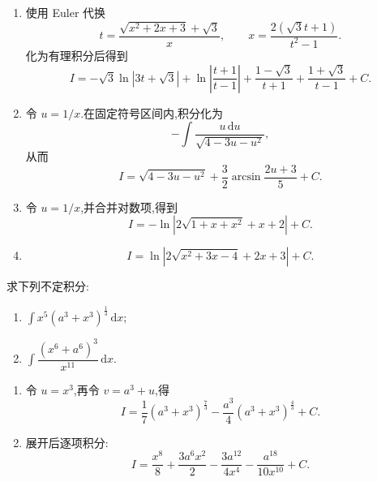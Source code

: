 \begin{solution}
    \begin{enumerate}
        \item 使用 Euler 代换
              \[
                  t=\dfrac{\sqrt{x^2+2x+3}+\sqrt3}{x},
                  \qquad
                  x=\dfrac{2(\sqrt3t+1)}{t^2-1}.
              \]
              化为有理积分后得到
              \[
                  I=-\sqrt3\ln|3t+\sqrt3|+\ln\left|\dfrac{t+1}{t-1}\right|
                  +\dfrac{1-\sqrt3}{t+1}+\dfrac{1+\sqrt3}{t-1}+C.
              \]
        \item 令 $u=1/x$.在固定符号区间内,积分化为
              \[
                  -\int\dfrac{u\,\mathrm{d}u}{\sqrt{4-3u-u^2}},
              \]
              从而
              \[
                  I=\sqrt{4-3u-u^2}+\dfrac{3}{2}\arcsin\dfrac{2u+3}{5}+C.
              \]
        \item 令 $u=1/x$,并合并对数项,得到
              \[
                  I=-\ln\left|2\sqrt{1+x+x^2}+x+2\right|+C.
              \]
        \item
              \[
                  I=\ln\left|2\sqrt{x^2+3x-4}+2x+3\right|+C.
              \]
    \end{enumerate}
\end{solution}

\begin{example}
    求下列不定积分:
    \begin{enumerate}
        \item $\displaystyle\int x^5(a^3+x^3)^{\frac{1}{3}}\,\mathrm{d}x$;
        \item $\displaystyle\int\dfrac{(x^6+a^6)^3}{x^{11}}\,\mathrm{d}x$.
    \end{enumerate}
\end{example}
\exampleblank

\begin{solution}
    \begin{enumerate}
        \item 令 $u=x^3$,再令 $v=a^3+u$,得
              \[
                  I=\dfrac{1}{7}(a^3+x^3)^{\frac{7}{3}}
                  -\dfrac{a^3}{4}(a^3+x^3)^{\frac{4}{3}}+C.
              \]
        \item 展开后逐项积分:
              \[
                  I=\dfrac{x^8}{8}+\dfrac{3a^6x^2}{2}
                  -\dfrac{3a^{12}}{4x^4}-\dfrac{a^{18}}{10x^{10}}+C.
              \]
    \end{enumerate}
\end{solution}



